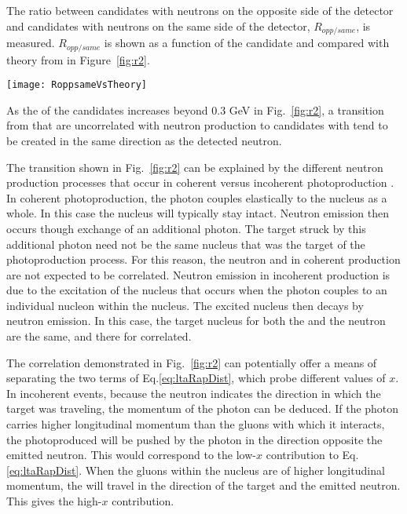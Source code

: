     The ratio between candidates with neutrons on the opposite side of the 
      detector and candidates with neutrons on the same side of the detector,
      $R_{opp/same}$, is measured.
    $R_{opp/same}$ is shown as a function of the candidate \pt{} and compared
      with theory from \cite{Guzey:2013jaa} in Figure~\ref{fig:r2}.
    \begin{figure*}[!Hhtb]
      \begin{center}
        \texttt{[image: RoppsameVsTheory]}
        \caption{\label{fig:r2}Ratio between the transverse momentum 
          distribution of the $J/\psi$ when  $J/\psi$ and neutron have 
          the opposite direction and the transverse momentum distribution 
          of the $J/\psi$ when  $J/\psi$ and neutron have the same direction.}
      \end{center}
    \end{figure*}
    As the \pt{} of the candidates increases beyond 0.3 GeV in Fig.~\ref{fig:r2},
      a transition from \JPsi{} that are uncorrelated with neutron production 
      to \JPsi{} candidates with tend to be created in the same direction as
      the detected neutron. 

    The transition shown in Fig.~\ref{fig:r2} can be explained by the different
      neutron production processes that occur in coherent versus incoherent 
      photoproduction \cite{Strikman:2005ze}.
    In coherent photoproduction, the photon couples elastically to the nucleus 
      as a whole.
    In this case the nucleus will typically stay intact.
    Neutron emission then occurs though exchange of an additional photon. 
    The target struck by this additional photon need not be the same nucleus
      that was the target of the photoproduction process. 
    For this reason, the neutron and \JPsi{} in coherent production are not 
      expected to be correlated.
    Neutron emission in incoherent production is due to the excitation of the 
      nucleus that occurs when the photon couples to an individual nucleon within 
      the nucleus.
    The excited nucleus then decays by neutron emission. 
    In this case, the target nucleus for both the \JPsi{} and the neutron 
       are the same, and there for correlated. 

    The correlation demonstrated in Fig.~\ref{fig:r2} can potentially offer a 
      means of separating the two terms of Eq.\ref{eq:ltaRapDist}, which probe 
      different values of $x$. 
    In incoherent events, because the neutron indicates the direction in which
      the target was traveling, the momentum of the photon can be deduced. 
    If the photon carries higher longitudinal momentum than the gluons with 
      which it interacts, the photoproduced \JPsi{} will be pushed by the 
      photon in the direction opposite the emitted neutron. 
    This would correspond to the low-$x$ contribution to Eq.\ref{eq:ltaRapDist}.
    When the gluons within the nucleus are of higher longitudinal momentum, 
      the \JPsi{} will travel in the direction of the target and the emitted 
      neutron. 
    This gives the high-$x$ contribution. 

